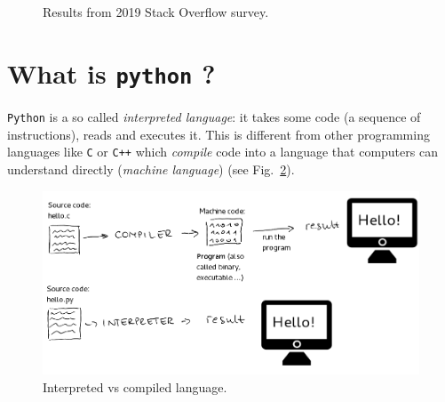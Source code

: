 \begin{figure}[!ht]
	\centering
	\\
	\\
	\caption{Results from 2019 Stack Overflow survey.}
	\label{fig:dummy}
\end{figure}

\section{What is \texttt{python} ?}
\label{what-is-python}

\texttt{Python} is a so called \emph{interpreted language}: it takes some code (a sequence of instructions), reads and executes it. This is different from other programming languages like \texttt{C} or \texttt{C++} which \emph{compile} code into a language that computers can understand directly (\emph{machine language}) (see Fig.~\ref{fig:compiled_vs_interpreted}).

\begin{figure}[h]
\centering
\includegraphics[width=0.7\linewidth]{figures/compiled_language.png}
\caption{Interpreted vs compiled language.}
\label{fig:compiled_vs_interpreted}
\end{figure}

